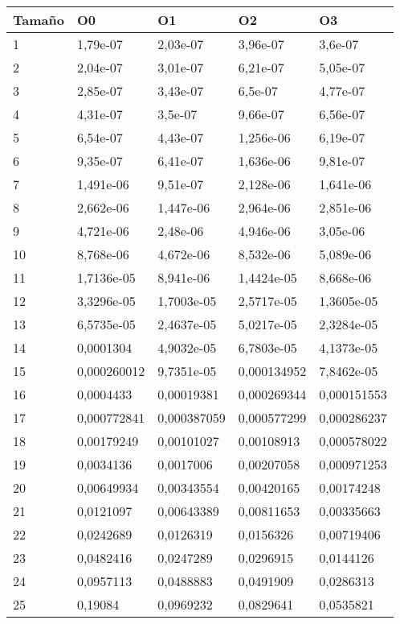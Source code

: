 \begin{tabular}{|l|l|l|l|l|}
	\hline
	Tamaño & O0 & O1 & O2 & O3 \\
	\hline
	\hline
	1 & 1,79e-07 & 2,03e-07 & 3,96e-07 & 3,6e-07 \\
	\hline
	2 & 2,04e-07 & 3,01e-07 & 6,21e-07 & 5,05e-07 \\
	\hline
	3 & 2,85e-07 & 3,43e-07 & 6,5e-07 & 4,77e-07 \\
	\hline
	4 & 4,31e-07 & 3,5e-07 & 9,66e-07 & 6,56e-07 \\
	\hline
	5 & 6,54e-07 & 4,43e-07 & 1,256e-06 & 6,19e-07 \\
	\hline
	6 & 9,35e-07 & 6,41e-07 & 1,636e-06 & 9,81e-07 \\
	\hline
	7 & 1,491e-06 & 9,51e-07 & 2,128e-06 & 1,641e-06 \\
	\hline
	8 & 2,662e-06 & 1,447e-06 & 2,964e-06 & 2,851e-06 \\
	\hline
	9 & 4,721e-06 & 2,48e-06 & 4,946e-06 & 3,05e-06 \\
	\hline
	10 & 8,768e-06 & 4,672e-06 & 8,532e-06 & 5,089e-06 \\
	\hline
	11 & 1,7136e-05 & 8,941e-06 & 1,4424e-05 & 8,668e-06 \\
	\hline
	12 & 3,3296e-05 & 1,7003e-05 & 2,5717e-05 & 1,3605e-05 \\
	\hline
	13 & 6,5735e-05 & 2,4637e-05 & 5,0217e-05 & 2,3284e-05 \\
	\hline
	14 & 0,0001304 & 4,9032e-05 & 6,7803e-05 & 4,1373e-05 \\
	\hline
	15 & 0,000260012 & 9,7351e-05 & 0,000134952 & 7,8462e-05 \\
	\hline
	16 & 0,0004433 & 0,00019381 & 0,000269344 & 0,000151553 \\
	\hline
	17 & 0,000772841 & 0,000387059 & 0,000577299 & 0,000286237 \\
	\hline
	18 & 0,00179249 & 0,00101027 & 0,00108913 & 0,000578022 \\
	\hline
	19 & 0,0034136 & 0,0017006 & 0,00207058 & 0,000971253 \\
	\hline
	20 & 0,00649934 & 0,00343554 & 0,00420165 & 0,00174248 \\
	\hline
	21 & 0,0121097 & 0,00643389 & 0,00811653 & 0,00335663 \\
	\hline
	22 & 0,0242689 & 0,0126319 & 0,0156326 & 0,00719406 \\
	\hline
	23 & 0,0482416 & 0,0247289 & 0,0296915 & 0,0144126 \\
	\hline
	24 & 0,0957113 & 0,0488883 & 0,0491909 & 0,0286313 \\
	\hline
	25 & 0,19084 & 0,0969232 & 0,0829641 & 0,0535821 \\
	\hline
\end{tabular}
